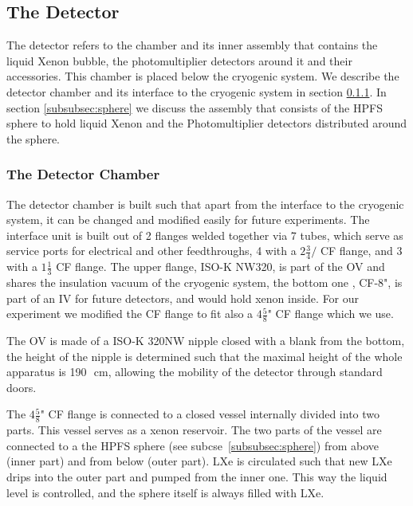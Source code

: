 \subsection{The Detector}
\label{subsec:det}
 

The detector refers to the chamber and its inner assembly that contains the liquid Xenon bubble, the photomultiplier detectors around it and their accessories. This chamber is placed below the cryogenic system. We describe the detector chamber and its interface to the cryogenic system in section \ref{subsubsec:detchamber}. In section \ref{subsubsec:sphere} we discuss the assembly 
that consists of the HPFS sphere to hold liquid Xenon and the Photomultiplier detectors distributed around the sphere.
\subsubsection{The Detector Chamber}
\label{subsubsec:detchamber}

The detector chamber is built such that apart from the interface to the cryogenic system, it can be changed and modified easily for future experiments.
The interface unit is built out of 2 flanges welded together via 7 tubes, which serve as service ports for electrical and other feedthroughs, 4 with a $2 \frac{3}{4}/$ CF flange, and 3 with a $1\frac{1}{3}$ CF flange. 
The upper flange, ISO-K NW320, is part of the OV and shares the insulation vacuum of the cryogenic system, the bottom one , CF-8", is 
part of an IV for future detectors, and would hold xenon inside. For our experiment we modified the CF flange to fit also a $4\frac{5}{8}$" CF 
flange which we use.

The OV is made of a ISO-K 320NW nipple closed with a blank from the bottom, the height of the nipple is determined such that the maximal height of the whole apparatus is 190~\,cm, allowing the mobility of the detector through standard doors.
 
The $4\frac{5}{8}$" CF flange is connected to a closed vessel internally divided into two parts. This vessel serves as a xenon reservoir. 
The two parts of the vessel are connected to a the HPFS sphere (see subcse~\ref{subsubsec:sphere}) from above (inner part) and from below (outer part). LXe is circulated such that new LXe drips into the outer part and pumped from the inner one. This way the liquid level is controlled, and the sphere itself is always filled with LXe. 



